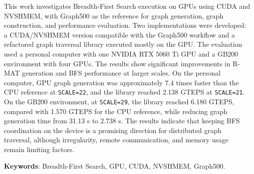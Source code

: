 This work investigates Breadth-First Search execution on GPUs using CUDA and
NVSHMEM, with Graph500 as the reference for graph generation, graph construction,
and performance evaluation. Two implementations were developed: a CUDA/NVSHMEM
version compatible with the Graph500 workflow and a refactored graph traversal
library executed mostly on the GPU. The evaluation used a personal computer with
one NVIDIA RTX 5060 Ti GPU and a GB200 environment with four GPUs. The results
show significant improvements in R-MAT generation and BFS performance at larger
scales. On the personal computer, GPU graph generation was approximately $7.4$
times faster than the CPU reference at \texttt{SCALE=22}, and the library reached
2.138 GTEPS at \texttt{SCALE=21}. On the GB200 environment, at
\texttt{SCALE=29}, the library reached 6.180 GTEPS, compared with 1.570 GTEPS for
the CPU reference, while reducing graph generation time from 31.13 s to 2.738 s.
The results indicate that keeping BFS coordination on the device is a promising
direction for distributed graph traversal, although irregularity, remote
communication, and memory usage remain limiting factors.

\textbf{Keywords}: Breadth-First Search, GPU, CUDA, NVSHMEM, Graph500.
